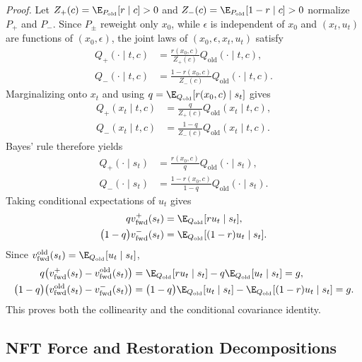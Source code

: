 \documentclass{article}
\begin{document}
\noindent\textit{Proof.} Let
$Z_+(c)=\E_{P_{\mathrm{old}}}[r\mid c]>0$ and
$Z_-(c)=\E_{P_{\mathrm{old}}}[1-r\mid c]>0$ normalize $P_+$ and $P_-$. Since $P_\pm$ reweight only $x_0$, while $\epsilon$ is independent of $x_0$ and $(x_t,u_t)$ are functions of $(x_0,\epsilon)$, the joint laws of $(x_0,\epsilon,x_t,u_t)$ satisfy
\begin{align}
Q_+(\cdot\mid t,c)
&=\frac{r(x_0,c)}{Z_+(c)}Q_{\mathrm{old}}(\cdot\mid t,c),\\
Q_-(\cdot\mid t,c)
&=\frac{1-r(x_0,c)}{Z_-(c)}Q_{\mathrm{old}}(\cdot\mid t,c).
\end{align}
Marginalizing onto $x_t$ and using
$q=\E_{Q_{\mathrm{old}}}[r(x_0,c)\mid s_t]$ gives
\begin{align}
Q_+(x_t\mid t,c)
&=\frac{q}{Z_+(c)}Q_{\mathrm{old}}(x_t\mid t,c),\\
Q_-(x_t\mid t,c)
&=\frac{1-q}{Z_-(c)}Q_{\mathrm{old}}(x_t\mid t,c).
\end{align}
Bayes' rule therefore yields
\begin{align}
Q_+(\cdot\mid s_t)
&=\frac{r(x_0,c)}{q}Q_{\mathrm{old}}(\cdot\mid s_t),\\
Q_-(\cdot\mid s_t)
&=\frac{1-r(x_0,c)}{1-q}Q_{\mathrm{old}}(\cdot\mid s_t).
\end{align}
Taking conditional expectations of $u_t$ gives
\begin{align}
q v_{\mathrm{fwd}}^+(s_t)
&=\E_{Q_{\mathrm{old}}}[r u_t\mid s_t],\\
\bigl(1-q\bigr)v_{\mathrm{fwd}}^-(s_t)
&=\E_{Q_{\mathrm{old}}}[(1-r)u_t\mid s_t].
\end{align}
Since $v_{\mathrm{fwd}}^{\mathrm{old}}(s_t)=
\E_{Q_{\mathrm{old}}}[u_t\mid s_t]$,
\begin{align}
q\bigl(v_{\mathrm{fwd}}^+(s_t)-v_{\mathrm{fwd}}^{\mathrm{old}}(s_t)\bigr)
&=\E_{Q_{\mathrm{old}}}[r u_t\mid s_t]
-q\E_{Q_{\mathrm{old}}}[u_t\mid s_t]
=g,\\
\bigl(1-q\bigr)
\bigl(v_{\mathrm{fwd}}^{\mathrm{old}}(s_t)-v_{\mathrm{fwd}}^-(s_t)\bigr)
&=\bigl(1-q\bigr)\E_{Q_{\mathrm{old}}}[u_t\mid s_t]
-\E_{Q_{\mathrm{old}}}[(1-r)u_t\mid s_t]
=g.
\end{align}
This proves both the collinearity and the conditional covariance identity.

\subsection{NFT Force and Restoration Decompositions}
\label{app:nft_decomposition_proofs}
\end{document}

